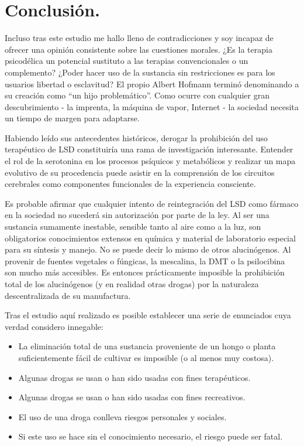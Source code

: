 \section{Conclusión.}

Incluso tras este estudio me hallo lleno de contradicciones y soy incapaz de ofrecer una opinión consistente sobre las cuestiones morales. ¿Es la terapia psicodélica un potencial sustituto a las terapias convencionales o un complemento? ¿Poder hacer uso de la sustancia sin restricciones es para los usuarios libertad o esclavitud? El propio Albert Hofmann terminó denominando a su creación como \enquote{un hijo problemático}. Como ocurre con cualquier gran descubrimiento - la imprenta, la máquina de vapor, Internet - la sociedad necesita un tiempo de margen para adaptarse.

Habiendo leído sus antecedentes históricos, derogar la prohibición del uso terapéutico de LSD constituiría una rama de investigación interesante. Entender el rol de la serotonina en los procesos psíquicos y metabólicos y realizar un mapa evolutivo de su procedencia puede asistir en la comprensión de los circuitos cerebrales como componentes funcionales de la experiencia consciente.

Es probable afirmar que cualquier intento de reintegración del LSD como fármaco en la sociedad no sucederá sin autorización por parte de la ley. Al ser una sustancia sumamente inestable, sensible tanto al aire como a la luz, son obligatorios conocimientos extensos en química y material de laboratorio especial para su síntesis y manejo. No se puede decir lo mismo de otros alucinógenos. Al provenir de fuentes vegetales o fúngicas, la mescalina, la DMT o la psilocibina son mucho más accesibles. Es entonces prácticamente imposible la prohibición total de los alucinógenos (y en realidad otras drogas) por la naturaleza descentralizada de su manufactura.

Tras el estudio aquí realizado es posible establecer una serie de enunciados cuya verdad considero innegable:

\begin{itemize}
	\item La eliminación total de una sustancia proveniente de un hongo o planta suficientemente fácil de cultivar es imposible (o al menos muy costosa).
	\item Algunas drogas se usan o han sido usadas con fines terapéuticos.
	\item Algunas drogas se usan o han sido usadas con fines recreativos.
	\item El uso de una droga conlleva riesgos personales y sociales.
	\item Si este uso se hace sin el conocimiento necesario, el riesgo puede ser fatal.
\end{itemize}

